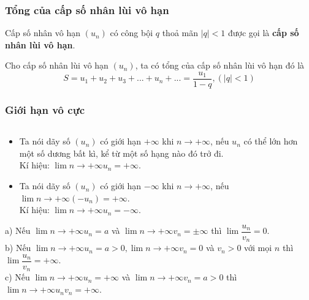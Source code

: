 \subsubsection{Tổng của cấp số nhân lùi vô hạn}
\begin{dn}
	Cấp số nhân vô hạn $(u_n)$ có công bội $q$ thoả mãn $|q|<1$ được gọi là \textbf{cấp số nhân lùi vô hạn}.
\end{dn}

\begin{dl}
Cho cấp số nhân lùi vô hạn $(u_n)$, ta có tổng của cấp số nhân lùi vô hạn đó là $$S=u_1+u_2+u_3+...+u_n+...=\dfrac{u_1}{1-q}, (|q|<1)$$
\end{dl}

\subsubsection{Giới hạn vô cực}
\begin{dn} $\textrm{ }$\\	
\begin{itemize}
\item  Ta nói dãy số $(u_n)$ có giới hạn $+\infty$ khi $n\to +\infty$, nếu $u_n$ có thể lớn hơn một số dương bất kì, kể từ một số hạng nào đó trở đi.\\
Kí hiệu: $\lim \limits{n \to +\infty}u_n=+\infty$.
\item  Ta nói dãy số $(u_n)$ có giới hạn $-\infty$ khi $n\to +\infty$, nếu $\lim \limits{n \to +\infty}(-u_n)=+\infty$.\\
Kí hiệu: $\lim \limits{n \to +\infty}u_n=-\infty$.
\end{itemize}
\end{dn}

\begin{dl} $\textrm{ }$\\
	a) Nếu $\lim \limits{n \to +\infty}u_n=a$ và $\lim \limits{n \to +\infty}v_n=\pm \infty$ thì $\lim\dfrac{u_n}{v_n}=0$.\\
	b) Nếu $\lim \limits{n \to +\infty}u_n=a>0, \lim \limits{n \to +\infty}v_n=0$ và $v_n>0$ với mọi $n$ thì $\lim\dfrac{u_n}{v_n}=+\infty$.\\
	c) Nếu $\lim \limits{n \to +\infty}u_n=+\infty$ và $\lim \limits{n \to +\infty}v_n=a>0$ thì $\lim \limits{n \to +\infty}u_nv_n=+\infty$.
\end{dl}

